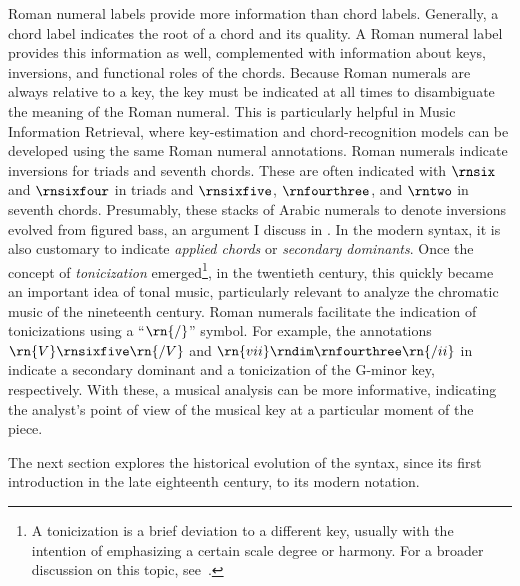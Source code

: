 Roman numeral labels provide more information than chord
labels. Generally, a chord label indicates the root of a
chord and its quality. A Roman numeral label provides this
information as well, complemented with information about
keys, inversions, and functional roles of the chords.
Because Roman numerals are always relative to a key, the key
must be indicated at all times to disambiguate the meaning
of the Roman numeral. This is particularly helpful in Music
Information Retrieval, where key-estimation and
chord-recognition models can be developed using the same
Roman numeral annotations. Roman numerals indicate
inversions for triads and seventh chords. These are often
indicated with $\rnsix$ and $\rnsixfour$ in triads and
$\rnsixfive$, $\rnfourthree$, and $\rntwo$ in seventh
chords. Presumably, these stacks of Arabic numerals to
denote inversions evolved from figured bass, an argument I
discuss in . In
the modern syntax, it is also customary to indicate
\emph{applied chords} or \emph{secondary dominants}. Once
the concept of \emph{tonicization} emerged\footnote{A
tonicization is a brief deviation to a different key,
usually with the intention of emphasizing a certain scale
degree or harmony. For a broader discussion on this topic,
see~\textcite{napoleslopez2020local}.}, in the twentieth
century, this quickly became an important idea of tonal
music, particularly relevant to analyze the chromatic music
of the nineteenth century. Roman numerals facilitate the
indication of tonicizations using a ``$\rn{/}$'' symbol. For
example, the annotations $\rn{V}\rnsixfive\rn{/V}$ and
$\rn{vii}\rndim\rnfourthree\rn{/ii}$ in 
indicate a secondary dominant and a tonicization of the
G-minor key, respectively. With these, a musical analysis
can be more informative, indicating the analyst's point of
view of the musical key at a particular moment of the piece.

The next section explores the historical evolution of the
syntax, since its first introduction in the late eighteenth
century, to its modern notation.

